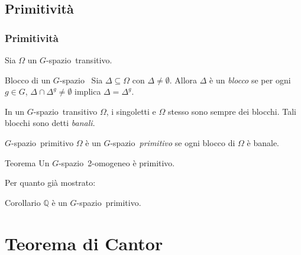 \documentclass[italian, aspectratio=169,bookmarks=false]{beamer}
\newcommand{\Q}{\mathbb{Q}} %
\newcommand{\0}{\setminus\{0\}} %
\newcommand{\Gsp}{$G$-spazio~} %
\theoremstyle{definition}
\theoremstyle{plain}
\begin{document}
\subsection{Primitività}
\begin{frame}
    \frametitle{Primitività}
    Sia $\Omega$ un \Gsp transitivo. \pause
    \begin{block}{Blocco di un \Gsp}
         Sia $\Delta \subseteq \Omega$ con $\Delta \neq \emptyset$. Allora $\Delta$ è un \emph{blocco} se per ogni $g \in G$, $\Delta \cap \Delta^g \neq \emptyset$ implica $\Delta=\Delta^g$.
    \end{block} \pause
    In un \Gsp transitivo $\Omega$, i singoletti e $\Omega$ stesso sono sempre dei blocchi. Tali blocchi sono detti \emph{banali}. \pause
    \medskip
    \begin{block}{\Gsp primitivo}
        $\Omega$ è un \Gsp \emph{primitivo} se ogni blocco di $\Omega$ è banale.
    \end{block}
\end{frame}
\begin{frame}
    \begin{alertblock}{Teorema}
        Un \Gsp 2-omogeneo è primitivo.
    \end{alertblock} \pause
    \bigskip Per quanto già mostrato:
    \begin{alertblock}{Corollario}
        $\Q$ è un \Gsp primitivo.
    \end{alertblock}
\end{frame}

\section{Teorema di Cantor}
\end{document}
